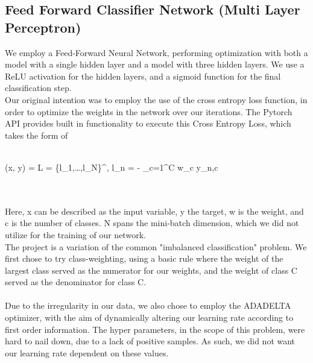 \documentclass[11.5pt]{article}
\begin{document}
\subsection{Feed Forward Classifier Network (Multi Layer Perceptron)}
We employ a Feed-Forward Neural Network, performing optimization with both a model with a single hidden layer and a model with three hidden layers. We use a ReLU activation for the hidden layers, and a sigmoid function for the final classification step. 
\\ 
Our original intention was to employ the use of the cross entropy loss function, in order to optimize the weights in the network over our iterations. The Pytorch API provides built in functionality to execute this Cross Entropy Loss, which takes the form of
\\
\\
\begin{center}
 \ell(x, y) = L = \{l_1,\dots,l_N\}^\top, \quad
          l_n = - \sum_{c=1}^C w_c \log {} y_{n,c}
\end{center}
\\
\\
Here, x can be described as the input variable, y the target, w is the weight, and c is the number of classes. N spans the mini-batch dimension, which we did not utilize for the training of our network.
\\
The project is a variation of the common "imbalanced classification" problem. We first chose to try class-weighting, using a basic rule where the weight of the largest class served as the numerator for our weights, and the weight of class C served as the denominator for class C. 
\\
\\
Due to the irregularity in our data, we also chose to employ the ADADELTA optimizer, with the aim of dynamically altering our learning rate according to first order information. The hyper parameters, in the scope of this problem, were hard to nail down, due to a lack of positive samples. As such, we did not want our learning rate dependent on these values. 
\\
\\
\\
\\
\end{document}
